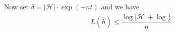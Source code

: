\documentclass[11pt,a4paper]{ctexart}
\numberwithin{equation}{section}%
\begin{document}
Now set $ \delta = \left\vert \mathcal{H} \right\vert  \cdot \exp\left( -nt \right)$ and we have
\begin{align*}
    L(\hat{h}) \leq \dfrac{ \log \left\vert \mathcal{H} \right\vert  + \log \frac{1}{\delta } }{ n }  
\end{align*}



\end{document}
